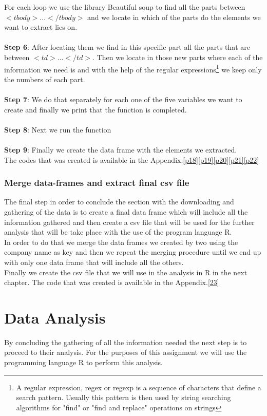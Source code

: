 \documentclass{book}
\begin{document}
For each loop we use the library Beautiful soup to find all the parts between $<tbody>...</tbody>$ and we locate in which of the parts do the elements we want to extract lies on.\\\\
\textbf{Step 6}: After locating them we find in this specific part all the parts that are between $<td>...</td>$. Then we locate in those new parts where each of the information we need is and with the help of the regular expressions\footnote{A regular expression, regex or regexp is  a sequence of characters that define a search pattern. Usually this pattern is then used by string searching algorithms for "find" or "find and replace" operations on strings} we keep only the numbers of each part.\\\\\textbf{Step 7}: We do that separately for each one of the five variables we want to create and finally we print that the function is completed.\\\\
\textbf{Step 8}: Next we run the function\\\\
\textbf{Step 9}: Finally we create the data frame with the elements we extracted.\\
The codes that was created is available in the Appendix.\ref{p18}\ref{p19}\ref{p20}\ref{p21}\ref{p22} 


\subsection{Merge data-frames and extract final csv file}
The final step in order to conclude the section with the downloading and gathering of the data is to create a final data frame which will include all the information gathered and then create a csv file that will be used for the further analysis that will be take place with the use of the program language R.\\
In order to do that we merge the data frames we created by two using the company name as key and then we repeat the merging procedure until we end up with only one data frame that will include all the others.\\
Finally we create the csv file that we will use in the analysis in R in the next chapter. The code that was created is available in the Appendix.\ref{23}

\newpage  
\chapter{Data Analysis}
By concluding the gathering of all the information needed the next step is to proceed to their analysis. For the purposes of this assignment we will use the programming language R to perform this analysis.\cite{key1}
\end{document}
